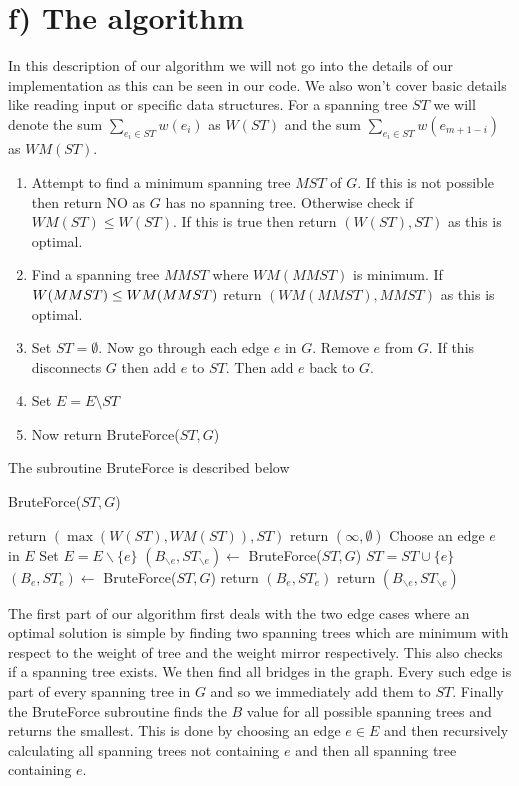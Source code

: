 \section*{f) The algorithm}

In this description of our algorithm we will not go into the details of our implementation as this can be seen in our code. We also won't cover basic details like reading input or specific data structures. For a spanning tree $ST$ we will denote the sum $\sum_{e_i \in ST} w(e_i) $ as $W(ST)$ and the sum $\sum_{e_i\in ST}w(e_{m+1-i})$ as $WM(ST)$. 

\begin{enumerate}
    \item Attempt to find a minimum spanning tree $MST$ of $G$. If this is not possible then return NO as $G$ has no spanning tree. Otherwise check if $WM(ST) \leq W(ST)$. If this is true then return $(W(ST),ST)$ as this is optimal.
    \item Find a spanning tree $MMST$ where $WM(MMST)$ is minimum. If $W(MMST) \leq \\WM(MMST)$ return $(WM(MMST),MMST)$ as this is optimal.
    \item Set $ST = \emptyset$. Now go through each edge $e$ in $G$. Remove $e$ from $G$. If this disconnects $G$ then add $e$ to $ST$. Then add $e$ back to $G$.
    \item Set $E = E \setminus ST$
    \item Now return BruteForce($ST,G$)
\end{enumerate}

The subroutine BruteForce is described below

\begin{algorithm}[H]
\caption{BruteForce($ST,G$)}\label{alg:bruteforce}
\begin{algorithmic}
    \State return $(\max(W(ST),WM(ST)),ST)$
\EndIf
{}
    \State return $(\infty,\emptyset)$
\EndIf
\State Choose an edge $e$ in $E$
\State Set $E = E\backslash \{e\}$
\State $(B_{\backslash e},ST_{\backslash e}) \leftarrow$ BruteForce($ST,G$)
    \State $ST = ST \cup \{e\}$
    \State $(B_{e},ST_{e}) \leftarrow$ BruteForce($ST,G$) 
        \State return $(B_e,ST_e)$
    \EndIf
\EndIf
\State return $(B_{\backslash e},ST_{\backslash e})$
\end{algorithmic}
\end{algorithm}

The first part of our algorithm first deals with the two edge cases where an optimal solution is simple by finding two spanning trees which are minimum with respect to the weight of tree and the weight mirror respectively. This also checks if a spanning tree exists. We then find all bridges in the graph. Every such edge is part of every spanning tree in $G$ and so we immediately add them to $ST$. Finally the BruteForce subroutine finds the $B$ value for all possible spanning trees and returns the smallest. This is done by choosing an edge $e \in E$ and then recursively calculating all spanning trees not containing $e$ and then all spanning tree containing $e$. 

